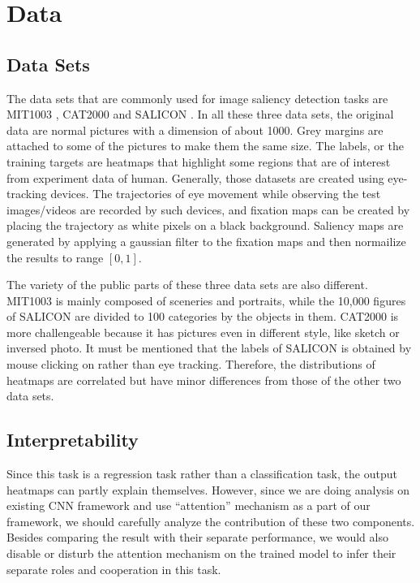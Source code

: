 \documentclass[12pt]{article}
\begin{document}
\section{Data}
\subsection{Data Sets}

The data sets that are commonly used for image saliency detection tasks are MIT1003 \cite{judd2012benchmark}, CAT2000 \cite{borji2015cat2000} and SALICON \cite{jiang2015salicon}.
In all these three data sets, the original data are normal pictures with a dimension of about 1000. Grey margins are attached to some of the pictures to make them the same size. 
The labels, or the training targets are heatmaps that highlight some regions that are of interest from experiment data of human.
Generally, those datasets are created using eye-tracking devices. The trajectories of eye movement while
observing the test images/videos are recorded by such devices, and fixation maps can be created
by placing the trajectory as white pixels on a black background. Saliency maps are generated by
applying a gaussian filter to the fixation maps and then normailize the results to range $[0, 1]$.


The variety of the public parts of these three data sets are also different. MIT1003 is mainly composed of sceneries and portraits, while the 10,000 figures of SALICON are divided to 100 categories by the objects in them. CAT2000 is more challengeable because it has pictures even in different style, like sketch or inversed photo. 
It must be mentioned that the labels of SALICON is obtained by mouse clicking on rather than eye tracking. Therefore, the distributions of heatmaps are correlated but have minor differences from those of the other two data sets.

\subsection{Interpretability}

Since this task is a regression task rather than a classification task, the output heatmaps can partly explain themselves. 
However, since we are doing analysis on existing CNN framework and use “attention” mechanism as a part of our framework, we should carefully analyze the contribution of these two components. 
Besides comparing the result with their separate performance, we would also disable or disturb the attention mechanism on the trained model to infer their separate roles and cooperation in this task.
\end{document}
